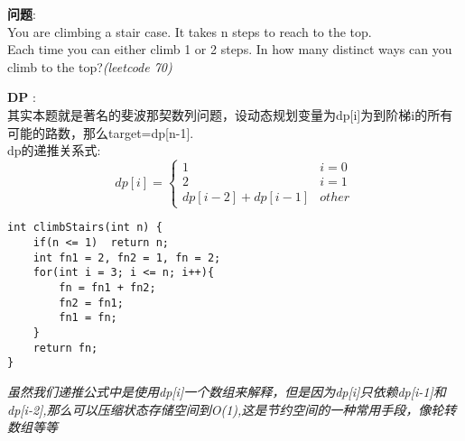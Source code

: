     
\begin{description}
    \item{\textbf{问题}}:\\
You are climbing a stair case. It takes n steps to reach to the top.\\
Each time you can either climb 1 or 2 steps. In how many distinct ways can you climb to the top?\textit{(leetcode 70)}
    \item{\textbf{DP}} : 
    \\其实本题就是著名的斐波那契数列问题，设动态规划变量为dp[i]为到阶梯i的所有可能的路数，那么target=dp[n-1].
	\\dp的递推关系式:
$$
dp[i] =
\begin{cases} 
1 & i = 0 \\
2 & i = 1 \\
dp[i-2]+dp[i-1] & other
\end{cases}
$$
    \begin{lstlisting}
int climbStairs(int n) {
	if(n <= 1)	return n;
	int fn1 = 2, fn2 = 1, fn = 2;
	for(int i = 3; i <= n; i++){
		fn = fn1 + fn2;
		fn2 = fn1;
		fn1 = fn;
	}
	return fn;
}
    \end{lstlisting}
	\textit{虽然我们递推公式中是使用dp[i]一个数组来解释，但是因为dp[i]只依赖dp[i-1]和dp[i-2],那么可以压缩状态存储空间到O(1),这是节约空间的一种常用手段，像轮转数组等等}
\end{description}

